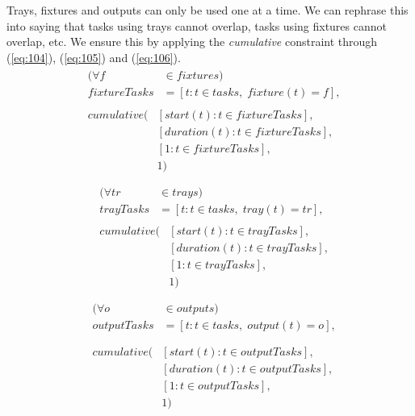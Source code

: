   \noindent Trays, fixtures and outputs can only be used one at a time. We can rephrase this into saying that tasks using trays cannot overlap, tasks using fixtures cannot overlap, etc. We ensure this by applying the \emph{cumulative} constraint through (\ref{eq:104}), (\ref{eq:105}) and (\ref{eq:106}).
 \begin{equation}
 \begin{aligned}\label{eq:104}
 &\begin{aligned}
 (\forall f &\in fixtures) \\
 fixtureTasks &= [t : t \in tasks, \; fixture(t) = f], 
 \end{aligned}\\
 &\begin{aligned}
 cumulative(&[start(t) : t \in fixtureTasks],\\
 &[duration(t) : t \in fixtureTasks],\\
 &[1 : t \in fixtureTasks],\\
 &1)
 \end{aligned}\\
 \end{aligned}
 \end{equation}
 \begin{equation}
 \begin{aligned}\label{eq:105}
 &\begin{aligned}
 (\forall tr &\in trays) \\
 trayTasks &= [t : t \in tasks, \; tray(t) = tr], 
 \end{aligned}\\
 &\begin{aligned}
 cumulative(&[start(t) : t \in trayTasks],\\
 &[duration(t) : t \in trayTasks],\\
 &[1 : t \in trayTasks],\\
 &1)
 \end{aligned}\\
 \end{aligned}
 \end{equation}
 \begin{equation}
 \begin{aligned}\label{eq:106}
 &\begin{aligned}
 (\forall o &\in outputs) \\
 outputTasks &= [t : t \in tasks, \; output(t) = o], \\
 \end{aligned}\\
 &\begin{aligned}
 cumulative(&[start(t) : t \in outputTasks], \\
 &[duration(t) : t \in outputTasks], \\
 &[1 : t \in outputTasks], \\
 &1)
 \end{aligned}\\
 \end{aligned}
 \end{equation}

